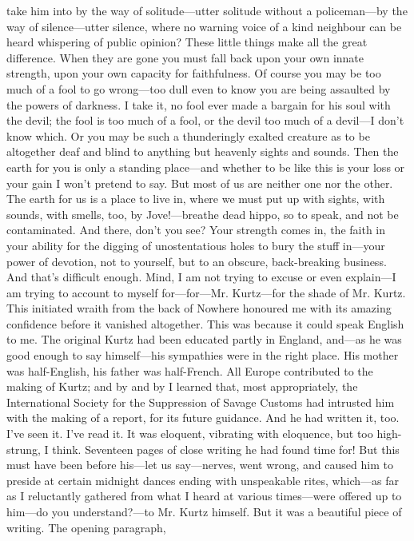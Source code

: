 \documentclass[12pt]{report}
\begin{document}
take him into by the way of solitude---utter solitude without a
policeman---by the way of silence---utter silence, where no warning
voice of a kind neighbour can be heard whispering of public opinion?
These little things make all the great difference. When they are gone
you must fall back upon your own innate strength, upon your own capacity
for faithfulness. Of course you may be too much of a fool to go
wrong---too dull even to know you are being assaulted by the powers of
darkness. I take it, no fool ever made a bargain for his soul with the
devil; the fool is too much of a fool, or the devil too much of a
devil---I don't know which. Or you may be such a thunderingly exalted
creature as to be altogether deaf and blind to anything but heavenly
sights and sounds. Then the earth for you is only a standing place---and
whether to be like this is your loss or your gain I won't pretend to
say. But most of us are neither one nor the other. The earth for us is a
place to live in, where we must put up with sights, with sounds, with
smells, too, by Jove!---breathe dead hippo, so to speak, and not be
contaminated. And there, don't you see? Your strength comes in, the
faith in your ability for the digging of unostentatious holes to bury
the stuff in---your power of devotion, not to yourself, but to an
obscure, back-breaking business. And that's difficult enough. Mind, I am
not trying to excuse or even explain---I am trying to account to myself
for---for---Mr. Kurtz---for the shade of Mr. Kurtz. This initiated
wraith from the back of Nowhere honoured me with its amazing confidence
before it vanished altogether. This was because it could speak English
to me. The original Kurtz had been educated partly in England, and---as
he was good enough to say himself---his sympathies were in the right
place. His mother was half-English, his father was half-French. All
Europe contributed to the making of Kurtz; and by and by I learned that,
most appropriately, the International Society for the Suppression of
Savage Customs had intrusted him with the making of a report, for its
future guidance. And he had written it, too. I've seen it. I've read it.
It was eloquent, vibrating with eloquence, but too high-strung, I think.
Seventeen pages of close writing he had found time for! But this must
have been before his---let us say---nerves, went wrong, and caused him
to preside at certain midnight dances ending with unspeakable rites,
which---as far as I reluctantly gathered from what I heard at various
times---were offered up to him---do you understand?---to Mr. Kurtz
himself. But it was a beautiful piece of writing. The opening paragraph,
\end{document}
